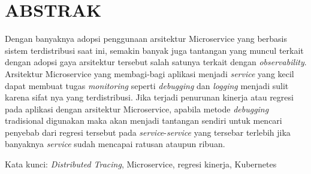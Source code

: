\clearpage
\chapter*{ABSTRAK}

Dengan banyaknya adopsi penggunaan arsitektur Microservice yang berbasis sistem terdistribusi saat ini, semakin banyak juga tantangan yang muncul terkait dengan adopsi gaya arsitektur tersebut salah satunya terkait dengan \textit{observability}. Arsitektur Microservice yang membagi-bagi aplikasi menjadi \textit{service} yang kecil dapat membuat tugas \textit{monitoring} seperti \textit{debugging} dan \textit{logging} menjadi sulit karena sifat nya yang terdistribusi. Jika terjadi penurunan kinerja atau regresi pada aplikasi dengan arsitektur Microservice, apabila metode \textit{debugging} tradisional digunakan maka akan menjadi tantangan sendiri untuk mencari penyebab dari regresi tersebut pada \textit{service}-\textit{service} yang tersebar terlebih jika banyaknya \textit{service} sudah mencapai ratusan ataupun ribuan. 




\vspace{15mm}
Kata kunci: \textit{Distributed Tracing}, Microservice, regresi kinerja, Kubernetes
\clearpage
